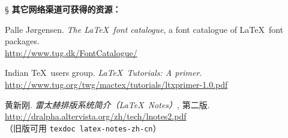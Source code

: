 \begin{thebibliography}{20}
\item[\S] {\bfseries 其它网络渠道可获得的资源：}

 Palle J{\o}rgensen.
  \newblock \emph{The \LaTeX\ font catalogue}, a font catalogue of \LaTeX\ font packages.\\
  \url{http://www.tug.dk/FontCatalogue/}

 Indian \TeX\ users group.
  \newblock \emph{\LaTeX\ Tutorials: A primer}. \\
  \url{http://www.tug.org/twg/mactex/tutorials/ltxprimer-1.0.pdf}

 黄新刚.
  \newblock \emph{雷太赫排版系统简介（\LaTeX\ Notes）}, 第二版. \\
  \url{http://dralpha.altervista.org/zh/tech/lnotes2.pdf} \\
  （旧版可用 \texttt{texdoc latex-notes-zh-cn}）

\end{thebibliography}

\endinput
